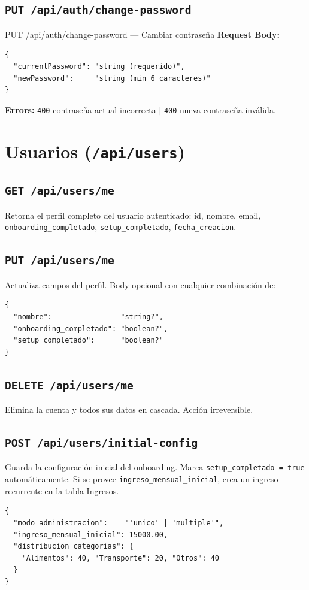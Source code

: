 \subsection{\texttt{PUT /api/auth/change-password}}

\begin{epbox}{PUT /api/auth/change-password --- Cambiar contraseña}
\textbf{Request Body:}
\begin{lstlisting}[style=json]
{
  "currentPassword": "string (requerido)",
  "newPassword":     "string (min 6 caracteres)"
}
\end{lstlisting}
\textbf{Errors:} \texttt{400} contraseña actual incorrecta $|$ \texttt{400} nueva contraseña inválida.
\end{epbox}

\section{Usuarios (\texttt{/api/users})}

\subsection{\texttt{GET /api/users/me}}
Retorna el perfil completo del usuario autenticado: id, nombre, email, \texttt{onboarding\_completado}, \texttt{setup\_completado}, \texttt{fecha\_creacion}.

\subsection{\texttt{PUT /api/users/me}}
Actualiza campos del perfil. Body opcional con cualquier combinación de:
\begin{lstlisting}[style=json]
{
  "nombre":                "string?",
  "onboarding_completado": "boolean?",
  "setup_completado":      "boolean?"
}
\end{lstlisting}

\subsection{\texttt{DELETE /api/users/me}}
Elimina la cuenta y todos sus datos en cascada. Acción irreversible.

\subsection{\texttt{POST /api/users/initial-config}}
Guarda la configuración inicial del onboarding. Marca \texttt{setup\_completado = true} automáticamente. Si se provee \texttt{ingreso\_mensual\_inicial}, crea un ingreso recurrente en la tabla Ingresos.
\begin{lstlisting}[style=json]
{
  "modo_administracion":    "'unico' | 'multiple'",
  "ingreso_mensual_inicial": 15000.00,
  "distribucion_categorias": {
    "Alimentos": 40, "Transporte": 20, "Otros": 40
  }
}
\end{lstlisting}

